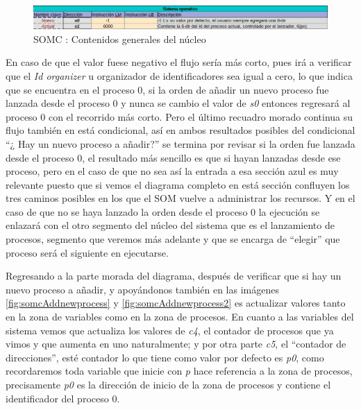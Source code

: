 \documentclass[letterpaper,12pt,oneside]{book}
\begin{document}
		\begin{figure}[h]		
			\centering
			\includegraphics[scale=0.6]{media/CARDIACC/SOMCGeneralNucleo.png}
			\caption{SOMC : Contenidos generales del núcleo}
			\label{fig:somcGeneralnucleo}
		\end{figure}

			En caso de que el valor fuese negativo el flujo sería más corto, pues irá a verificar que el \textit{Id organizer} u organizador de identificadores
			sea igual a cero, lo que indica que se encuentra en el proceso 0, si la orden de añadir un nuevo proceso fue lanzada desde el proceso 0 y
			nunca se cambio el valor de \textit{s0} entonces regresará al proceso 0 con el recorrido más corto. Pero el último recuadro
			morado continua su flujo también en está condicional, así en ambos resultados posibles del condicional ``¿ Hay un nuevo proceso a añadir?'' se termina por
			revisar si la orden fue lanzada desde el proceso 0, el resultado más sencillo es que si hayan lanzadas desde ese proceso, pero en el caso
			de que no sea así la entrada a esa sección azul es muy relevante puesto que si vemos el diagrama completo en está sección confluyen los
			tres caminos posibles en los que el SOM vuelve a administrar los recursos. Y en el caso de que no se haya lanzado la orden
			desde el proceso 0 la ejecución se enlazará con el otro segmento del núcleo del sistema que es el lanzamiento de procesos, segmento que veremos
			más adelante y que se encarga de ``elegir'' que proceso será el siguiente en ejecutarse.
			
			
			Regresando a la parte morada del diagrama, después de verificar que si hay un nuevo proceso a añadir, y apoyándonos
			también en las imágenes \ref{fig:somcAddnewprocess} y \ref{fig:somcAddnewprocess2} es actualizar valores tanto en la zona de variables
			como en la zona de procesos. En cuanto a las variables del sistema vemos que actualiza los valores de \textit{c4}, el contador
			de procesos que ya vimos y que aumenta en uno naturalmente; y por otra parte \textit{c5}, el ``contador de direcciones'', esté contador
			lo que tiene como valor por defecto es \textit{p0}, como recordaremos toda variable que inicie con \textit{p} hace referencia a la zona de procesos,
			precisamente \textit{p0} es la dirección de inicio de la zona de procesos y contiene el identificador del proceso 0. 
\end{document}
